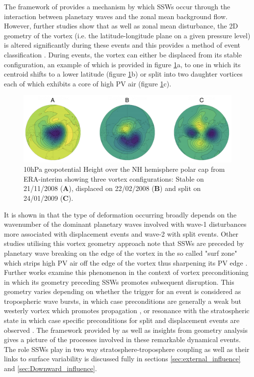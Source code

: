The framework of \cite{matsunoDynamical1971b} provides a mechanism by which SSWs occur through the interaction between planetary waves and the zonal mean background flow. However, further studies show that as well as zonal mean disturbance, the 2D geometry of the vortex (i.e. the latitude-longitude plane on a given pressure level) is altered significantly during these events and this provides a method of event classification \citep{lehtonenObserved2016b, Mitchell2011a, Seviour2013}. During events, the vortex can either be displaced from its stable configuration, an example of which is provided in figure \ref{fig:GPH_schematic}a, to one in which its centroid shifts to a lower latitude (figure \ref{fig:GPH_schematic}b) or split into two daughter vortices each of which exhibits a core of high PV air (figure \ref{fig:GPH_schematic}c). 
\begin{figure}[h!]
\centering
\includegraphics[width= \linewidth]{Figures/Figures-background/GPH_schematic.png}
\caption{10hPa geopotential Height over the NH hemisphere polar cap from ERA-interim showing three vortex configurations: Stable on 21/11/2008 (\textbf{A}), displaced on 22/02/2008 (\textbf{B}) and split on 24/01/2009 (\textbf{C}).}
\centering
\label{fig:GPH_schematic}
\end{figure}

It is shown in \cite{Seviour2013} that the type of deformation occurring broadly depends on the wavenumber of the dominant planetary waves involved with wave-1 disturbances more associated with displacement events and wave-2 with split events. Other studies utilising this vortex geometry approach note that SSWs are preceded by planetary wave breaking on the edge of the vortex in the so called "surf zone" which strips high PV air off the edge of the vortex thus sharpening its PV edge \citep{mcintyreBreaking1983}. Further works examine this phenomenon in the context of vortex preconditioning in which its geometry preceding SSWs promotes subsequent disruption. This geometry varies depending on whether the trigger for an event is considered as tropospheric wave bursts, in which case preconditions are generally a weak but westerly vortex which promotes propagation \citep{nishiiModulations2009b, kuttippurathComparative2012b}, or resonance with the stratospheric state in which case specific preconditions for split and displacement events are observed \citep{charltonNew2007c, bancalaPreconditioning2012b}. The framework provided by \cite{matsunoDynamical1971b} as well as insights from geometry analysis gives a picture of the processes involved in these remarkable dynamical events. The role SSWs play in two way stratosphere-troposphere coupling as well as their links to surface variability is discussed fully in sections \ref{sec:external_influence} and \ref{sec:Downward_influence}.

